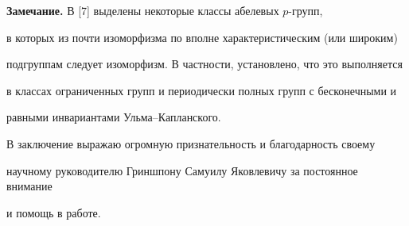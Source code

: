 {\bf Замечание.} В [7] выделены некоторые классы абелевых $p$-групп,


в которых из почти изоморфизма по вполне характеристическим (или широким)


подгруппам следует изоморфизм. В частности, установлено, что это выполняется


в классах ограниченных групп и периодически полных групп с бесконечными и


равными инвариантами Ульма--Капланского.


\medskip





В заключение выражаю огромную признательность и благодарность своему


научному руководителю Гриншпону Самуилу Яковлевичу за постоянное внимание


и помощь в работе.






